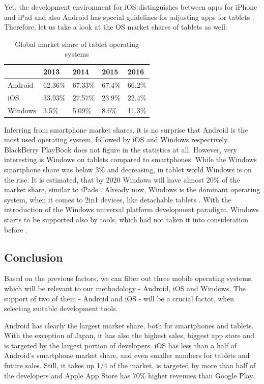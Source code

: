 \documentclass[english,master,public,dept460,male,cpdeclaration,oneside]{diploma}
\begin{document}
Yet, the development environment for iOS distinguishes between apps for iPhone and iPad \cite{appcodaiPad} and also Android has special guidelines for adjusting apps for tablets \cite{androidTablet}. Therefore, let us take a look at the OS market shares of tablets as well.

\begin{table}
	\centering
	\caption{Global market share of tablet operating systems \cite{tabletMarketShare}}
	\begin{tabular}{l l l l l}		
		\toprule
		 & 2013 & 2014 & 2015 & 2016 \\
		\midrule
		Android & 62.36\% & 67.33\% & 67.4\% & 66.2\% \\
		iOS & 33.93\% & 27.57\% & 23.9\% & 22.4\% \\
		Windows & 3.5\% & 5.09\% & 8.6\% & 11.3\% \\
		\midrule
	\end{tabular}
\end{table}

Inferring from smartphone market shares, it is no surprise that Android is the most used operating system, followed by iOS and Windows respectively. BlackBerry PlayBook does not figure in the statistics at all. However, very interesting is Windows on tablets compared to smartphones. While the Windows smartphone share was below 3\% and decreasing, in tablet world Windows is on the rise. It is estimated, that by 2020 Windows will have almost 20\% of the market share, similar to iPads \cite{idcTabletShare}. Already now, Windows is the dominant operating system, when it comes to 2in1 devices, like detachable tablets \cite{idcDetachableTablets}. With the introduction of the Windows universal platform development paradigm, Windows starts to be supported also by tools, which had not taken it into consideration before \cite{codenameOneNaive}. 

\subsection{Conclusion}
Based on the previous factors, we can filter out three mobile operating systems, which will be relevant to our methodology - Android, iOS and Windows. The support of two of them - Android and iOS - will be a crucial factor, when selecting suitable development tools. 

Android has clearly the largest market share, both for smartphones and tablets. With the exception of Japan, it has also the highest sales, biggest app store and is targeted by the largest portion of developers. iOS has less than a half of Android’s smartphone market share, and even smaller numbers for tablets and future sales. Still, it takes up 1/4 of the market, is targeted by more than half of the developers and Apple App Store has 70\% higher revenues than Google Play.
\end{document}
